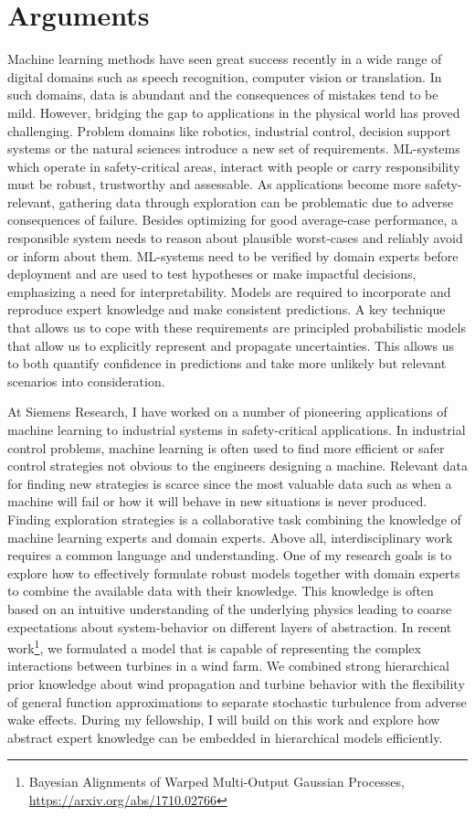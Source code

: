 \section{Arguments}
Machine learning methods have seen great success recently in a wide range of digital domains such as speech recognition, computer vision or translation.
In such domains, data is abundant and the consequences of mistakes tend to be mild.
However, bridging the gap to applications in the physical world has proved challenging.
Problem domains like robotics, industrial control, decision support systems or the natural sciences introduce a new set of requirements.
ML-systems which operate in safety-critical areas, interact with people or carry responsibility must be robust, trustworthy and assessable.
As applications become more safety-relevant, gathering data through exploration can be problematic due to adverse consequences of failure.
Besides optimizing for good average-case performance, a responsible system needs to reason about plausible worst-cases and reliably avoid or inform about them.
ML-systems need to be verified by domain experts before deployment and are used to test hypotheses or make impactful decisions, emphasizing a need for interpretability.
Models are required to incorporate and reproduce expert knowledge and make consistent predictions.
A key technique that allows us to cope with these requirements are principled probabilistic models that allow us to explicitly represent and propagate uncertainties.
This allows us to both quantify confidence in predictions and take more unlikely but relevant scenarios into consideration.

At Siemens Research, I have worked on a number of pioneering applications of machine learning to industrial systems in safety-critical applications.
In industrial control problems, machine learning is often used to find more efficient or safer control strategies not obvious to the engineers designing a machine.
Relevant data for finding new strategies is scarce since the most valuable data such as when a machine will fail or how it will behave in new situations is never produced.
Finding exploration strategies is a collaborative task combining the knowledge of machine learning experts and domain experts.
Above all, interdisciplinary work requires a common language and understanding.
One of my research goals is to explore how to effectively formulate robust models together with domain experts to combine the available data with their knowledge.
This knowledge is often based on an intuitive understanding of the underlying physics leading to coarse expectations about system-behavior on different layers of abstraction.
In recent work\footnote{Bayesian Alignments of Warped Multi-Output Gaussian Processes, \url{https://arxiv.org/abs/1710.02766}}, we formulated a model that is capable of representing the complex interactions between turbines in a wind farm.
We combined strong hierarchical prior knowledge about wind propagation and turbine behavior with the flexibility of general function approximations to separate stochastic turbulence from adverse wake effects.
During my fellowship, I will build on this work and explore how abstract expert knowledge can be embedded in hierarchical models efficiently.

